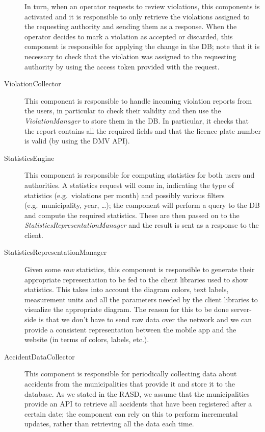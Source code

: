 \begin{description}
    In turn, when an operator requests to review violations, this components is
    activated and it is responsible to only retrieve the violations assigned to
    the requesting authority and sending them as a response.
    When the operator decides to mark a violation as accepted or discarded, this
    component is responsible for applying the change in the DB; note that it is
    necessary to check that the violation was assigned to the requesting
    authority by using the access token provided with the request.
    \item[ViolationCollector] This component is responsible to handle incoming
    violation reports from the users, in particular to check their validity and
    then use the \emph{ViolationManager} to store them in the DB.
    In particular, it checks that the report contains all the required fields
    and that the licence plate number is valid (by using the DMV API).
    \item[StatisticsEngine] This component is responsible for computing
    statistics for both users and authorities. A statistics request will come
    in, indicating the type of statistics (e.g.\ violations per month) and
    possibly various filters (e.g.\ municipality, year, \dots); the component
    will perform a query to the DB and compute the required statistics.
    These are then passed on to the \emph{StatisticsRepresentationManager}
    and the result is sent as a response to the client.
    \item[StatisticsRepresentationManager] Given some \emph{raw} statistics,
    this component is responsible to generate their appropriate representation
    to be fed to the client libraries used to show statistics.
    This takes into account the diagram colors, text labels, measurement units
    and all the parameters needed by the client libraries to visualize the
    appropriate diagram.
    The reason for this to be done server-side is that we don't have to send
    raw data over the network and we can provide a consistent representation
    between the mobile app and the website (in terms of colors, labels, etc.).
    \item[AccidentDataCollector] This component is responsible for periodically
    collecting data about accidents from the municipalities that provide it
    and store it to the database. As we stated in the RASD, we assume that the
    municipalities provide an API to retrieve all accidents that have been
    registered after a certain date; the component can rely on this to perform
    incremental updates, rather than retrieving all the data each time.

\end{description}
